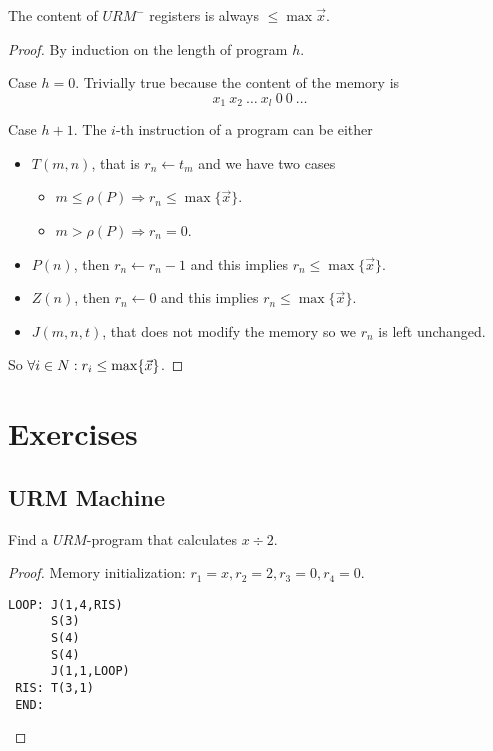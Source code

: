 \documentclass[12pt,a4paper,oneside]{book}
\begin{document}
\begin{lemma}
    \label{comp_ex_1_1_lemma}
    The content of $URM^-$ registers is always $\leq \max \vec{x}$.
    
    \begin{proof}
        By induction on the length of program $h$.
        
        \noindent Case $h = 0$. Trivially true because the content of the memory is \[ x_1\ x_2\ \ldots\ x_l\ 0\ 0\ \ldots \]
        
        \noindent Case $h + 1$. The $i$-th instruction of a program can be either
        \begin{itemize}
            \item $T(m,n)$, that is $r_n \leftarrow t_m$ and we have two cases
            \begin{itemize}
                \item $m \leq \rho(P) \Rightarrow r_n \leq \max \{\vec{x}\}$.
                \item $m > \rho(P) \Rightarrow r_n = 0$.
            \end{itemize}
            \item $P(n)$, then $r_n \leftarrow r_n - 1$ and this implies $r_n \leq \max \{\vec{x}\}$.
            \item $Z(n)$, then $r_n \leftarrow 0$ and this implies $r_n \leq \max \{\vec{x}\}$.
            \item $J(m,n,t)$, that does not modify the memory so we $r_n$ is left unchanged.
        \end{itemize}
        So $\forall i \in N \mathrel{:} r_i \leq \max \{ \vec{x} \}$.
    \end{proof}
\end{lemma}



\section{Exercises}

\subsection{URM Machine}

\begin{exercise}
    Find a $URM$-program that calculates $x \div 2$.

    \begin{proof}
        Memory initialization: $r_1 = x, r_2 = 2, r_3 = 0, r_4 = 0$.

\begin{verbatim}
LOOP: J(1,4,RIS)
      S(3)
      S(4)
      S(4)
      J(1,1,LOOP)
 RIS: T(3,1)
 END:
\end{verbatim}
    \end{proof}
\end{exercise}
\end{document}
